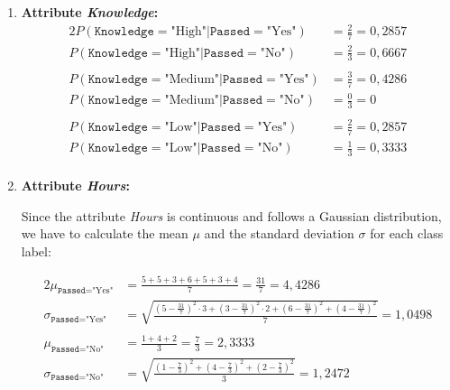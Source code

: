 \documentclass[
english,
smallborders
]{i6prcsht}
\newcommand{\Likelihood}[4]{P(\texttt{#1}=\text{"#2"} | \texttt{#3}=\text{"#4"})}
\begin{document}
\begin{solution}
\begin{enumerate}
\begin{enumerate}
			      \item \textbf{Attribute \textit{Knowledge}:}
			            \begin{alignat*}{2}
				            \Likelihood{Knowledge}{High}{Passed}{Yes}   & = \frac{2}{7} = 0,2857 \\
				            \Likelihood{Knowledge}{High}{Passed}{No}    & = \frac{2}{3} = 0,6667 \\
				                                                        &                        \\
				            \Likelihood{Knowledge}{Medium}{Passed}{Yes} & = \frac{3}{7} = 0,4286 \\
				            \Likelihood{Knowledge}{Medium}{Passed}{No}  & = \frac{0}{3} = 0      \\
				                                                        &                        \\
				            \Likelihood{Knowledge}{Low}{Passed}{Yes}    & = \frac{2}{7} = 0,2857 \\
				            \Likelihood{Knowledge}{Low}{Passed}{No}     & = \frac{1}{3} = 0,3333 \\
			            \end{alignat*}

			      \item \textbf{Attribute \textit{Hours}:}

			            Since the attribute \textit{Hours} is continuous and follows a Gaussian distribution, we have to calculate the mean $\mu$ and the standard deviation $\sigma$ for each class label:

			            \begin{alignat*}{2}
				            \mu_{\texttt{Passed}=\text{"Yes"}}    & = \frac{5 + 5 + 3 + 6 + 5 + 3 + 4}{7} = \frac{31}{7} = 4,4286                                                                 \\
				            \sigma_{\texttt{Passed}=\text{"Yes"}} & = \sqrt{\frac{(5-\frac{31}{7})^2 \cdot 3 + (3-\frac{31}{7})^2 \cdot 2 + (6-\frac{31}{7})^2 + (4-\frac{31}{7})^2}{7}} = 1,0498 \\
				                                                  &                                                                                                                               \\
				            \mu_{\texttt{Passed}=\text{"No"}}     & = \frac{1 + 4 + 2}{3} = \frac{7}{3} = 2,3333                                                                                  \\
				            \sigma_{\texttt{Passed}=\text{"No"}}  & = \sqrt{\frac{(1-\frac{7}{3})^2 + (4-\frac{7}{3})^2 + (2-\frac{7}{3})^2}{3}} = 1,2472                                         \\
			            \end{alignat*}


\end{enumerate}
\end{enumerate}
\end{solution}
\end{document}
